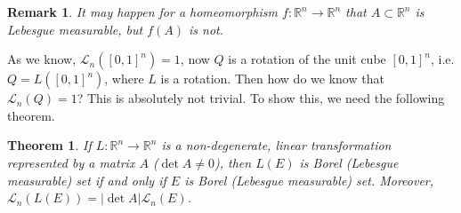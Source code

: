 \documentclass[11pt]{book}
\newtheorem{theorem}{Theorem}[chapter]
\newtheorem{remark}{Remark}[chapter]
\theoremstyle{definition}
\numberwithin{equation}{chapter}
\def\L{{\mathcal L}}
\begin{document}
\medskip

\begin{remark}
It may happen for a homeomorphism $f:\mathbb{R}^n \to \mathbb{R}^n$ that $A \subset \mathbb{R}^n$ is Lebesgue measurable, but $f(A)$ is not.
\end{remark}

\medskip

As we know, $\L_n([0,1]^n) = 1$, now $Q$ is a rotation of the unit cube $[0,1]^n$, i.e. $Q = L([0,1]^n)$, where $L$ is a rotation. Then how do we know that $\L_n(Q) = 1$? This is absolutely not trivial. To show this, we need the following theorem.

\medskip

\begin{theorem}
If $L:\mathbb{R}^n\to\mathbb{R}^n$ is a non-degenerate, linear transformation represented by a matrix $A$ ($\det A \neq 0$), then $L(E)$ is Borel (Lebesgue measurable) set if and only if $E$ is Borel (Lebesgue measurable) set. Moreover, $\L_n(L(E)) = \left|\det A\right| \L_n(E)$.
\end{theorem}
\end{document}
